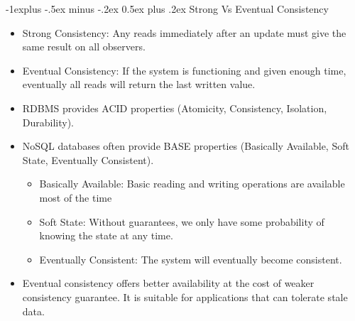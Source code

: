 \documentclass[10pt, landscape]{article}
\makeatletter
\renewcommand{\subsection}{\@startsection{subsection}{2}{0mm}%
  {-1explus -.5ex minus -.2ex}%
  {0.5ex plus .2ex}%
{\normalfont\normalsize\bfseries}}
\makeatother
\begin{document}
\begin{multicols*}{4}
  \subsection{Strong Vs Eventual Consistency}
  \begin{itemize}
    \item Strong Consistency: Any reads immediately after an update must give the same result on all observers.
    \item Eventual Consistency: If the system is functioning and given enough time, eventually all reads will return the last written value.
    \item RDBMS provides ACID properties (Atomicity, Consistency, Isolation, Durability).
    \item NoSQL databases often provide BASE properties (Basically Available, Soft State, Eventually Consistent).
    \begin{itemize}
      \item Basically Available: Basic reading and writing operations are available most of the time
      \item Soft State: Without guarantees, we only have some probability of knowing the state at any time.
      \item Eventually Consistent: The system will eventually become consistent.
    \end{itemize}
    \item Eventual consistency offers better availability at the cost of weaker consistency guarantee. It is suitable for applications that can tolerate stale data.
  \end{itemize}


\end{multicols*}
\end{document}

